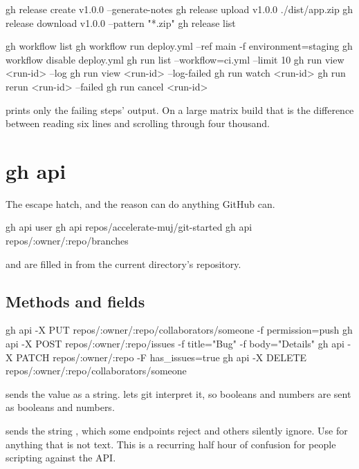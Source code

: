 \documentclass[11pt]{article}
\begin{document}
\begin{shell}
gh release create v1.0.0 --generate-notes
gh release upload v1.0.0 ./dist/app.zip
gh release download v1.0.0 --pattern "*.zip"
gh release list
\end{shell}

\begin{shell}
gh workflow list
gh workflow run deploy.yml --ref main -f environment=staging
gh workflow disable deploy.yml
gh run list --workflow=ci.yml --limit 10
gh run view <run-id> --log
gh run view <run-id> --log-failed
gh run watch <run-id>
gh run rerun <run-id> --failed
gh run cancel <run-id>
\end{shell}

 prints only the failing steps' output. On a large
matrix build that is the difference between reading six lines and scrolling through
four thousand.

\section{gh api}

The escape hatch, and the reason  can do anything GitHub can.

\begin{shell}
gh api user
gh api repos/accelerate-muj/git-started
gh api repos/:owner/:repo/branches
\end{shell}

 and  are filled in from the current directory's repository.

\subsection{Methods and fields}

\begin{shell}
gh api -X PUT repos/:owner/:repo/collaborators/someone -f permission=push
gh api -X POST repos/:owner/:repo/issues -f title="Bug" -f body="Details"
gh api -X PATCH repos/:owner/:repo -F has_issues=true
gh api -X DELETE repos/:owner/:repo/collaborators/someone
\end{shell}

\begin{trap}
 sends the value as a string.  lets git interpret it, so booleans and
numbers are sent as booleans and numbers.

 sends the string , which some endpoints reject
and others silently ignore. Use  for anything that is not text. This is a
recurring half hour of confusion for people scripting against the API.
\end{trap}
\end{document}
